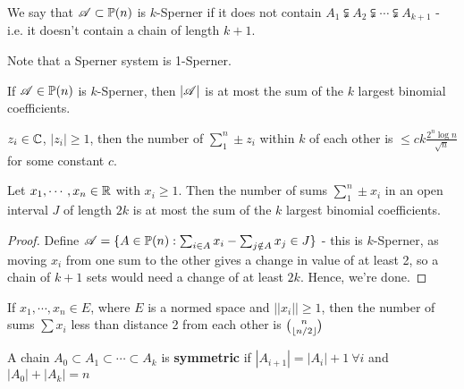 \documentclass[a4paper]{article}
\begin{document}
{\begin{defi}[$k$-Sperner]
	We say that $\mathscr{A}\subset\mathbb{P}(n)$ is $k$-Sperner if it does not contain $A_1\subsetneqq A_2\subsetneqq \cdots\subsetneqq A_{k+1}$ - i.e. it doesn't contain a chain of length $k+1$.
\end{defi}

Note that a Sperner system is 1-Sperner.

\begin{cor-num}[Erd\H{o}s, 1945]
	If $\mathscr{A}\in\mathbb{P}(n)$ is $k$-Sperner, then $|\mathscr{A}|$ is at most the sum of the $k$ largest binomial coefficients.
\end{cor-num}

\begin{thm}
	$z_i\in\mathbb{C}$, $\left|z_i\right|\geq 1$, then the number of $\sum_1^n\pm z_i$ within $k$ of each other is $\leq ck\frac{2^n\log n}{\sqrt{n}}$ for some constant $c$.
\end{thm}

\begin{thm-num}[Erd\H{o}s, 1945]
	Let $x_1,\cdots, x_n\in\mathbb{R}$ with $x_i\geq1$. Then the number of sums $\sum_1^n\pm x_i$ in an open interval $J$ of length $2k$ is at most the sum of the $k$ largest binomial coefficients.
\end{thm-num}
\begin{proof}
	Define $\mathscr{A}=\{A\in\mathbb{P}(n) : \sum_{i\in A}x_i - \sum_{j\notin A}x_j\in J\}$ - this is $k$-Sperner, as moving $x_i$ from one sum to the other gives a change in value of at least 2, so a chain of $k+1$ sets would need a change of at least $2k$. Hence, we're done.
\end{proof}

\begin{conj}[Erd\H{o}s, 1945]
	If $x_1,\cdots,x_n\in E$, where $E$ is a normed space and $\left|\left|x_i\right|\right|\geq1$, then the number of sums $\sum x_i$ less than distance 2 from each other is $\binom{n}{\left\lfloor n/2 \right\rfloor}$
\end{conj}

\begin{defi}
	A chain $A_0\subset A_1\subset \cdots \subset A_k$ is \textbf{symmetric} if $\left|A_{i+1}\right|=\left|A_{i}\right|+1\ \forall i$ and $\left|A_0\right|+\left|A_k\right|=n$
\end{defi}

}
\end{document}
